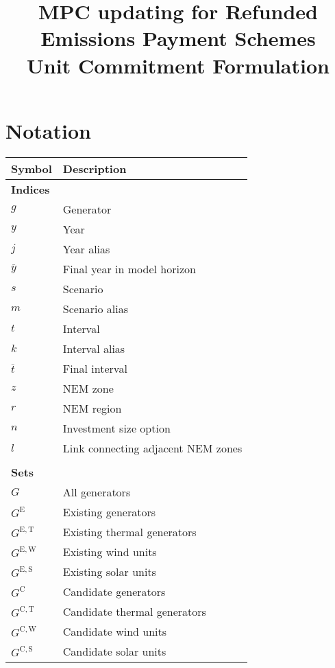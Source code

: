 \documentclass{article}
\title{MPC updating for Refunded Emissions Payment Schemes\\Unit Commitment Formulation}
\newcommand{\sGenerators}{G}
\newcommand{\sGeneratorsExisting}{G^{\mathrm{E}}}
\newcommand{\sGeneratorsExistingThermal}{G^{\mathrm{E,T}}}
\newcommand{\sGeneratorsExistingWind}{G^{\mathrm{E,W}}}
\newcommand{\sGeneratorsExistingSolar}{G^{\mathrm{E,S}}}
\newcommand{\sGeneratorsCandidate}{G^{\mathrm{C}}}
\newcommand{\sGeneratorsCandidateThermal}{G^{\mathrm{C,T}}}
\newcommand{\sGeneratorsCandidateWind}{G^{\mathrm{C,W}}}
\newcommand{\sGeneratorsCandidateSolar}{G^{\mathrm{C,S}}}
\newcommand{\iGenerator}{g}
\newcommand{\iYear}{y}
\newcommand{\iYearTerminal}{\overline{\iYear}}
\newcommand{\iYearAlias}{j}
\newcommand{\iScenario}{s}
\newcommand{\iScenarioAlias}{m}
\newcommand{\iInterval}{t}
\newcommand{\iIntervalAlias}{k}
\newcommand{\iIntervalTerminal}{\overline{\iInterval}}
\newcommand{\iZone}{z}
\newcommand{\iRegion}{r}
\newcommand{\iInvestmentSizeOption}{n}
\newcommand{\iLink}{l}
\begin{document}
	\maketitle
	

\section{Notation}
\renewcommand*{\arraystretch}{1.3}
\begin{longtable}{ p{}  p{}}
	\textbf{Symbol} & \textbf{Description}\\
	\hline\hline
	\multicolumn{2}{l}{\textbf{Indices}}\\
	$\iGenerator$ & Generator\\ 
	$\iYear$ & Year\\
	$\iYearAlias$ & Year alias\\
	$\iYearTerminal$ & Final year in model horizon\\
	$\iScenario$ & Scenario\\
	$\iScenarioAlias$ & Scenario alias\\
	$\iInterval$ & Interval\\
	$\iIntervalAlias$ & Interval alias\\
	$\iIntervalTerminal$ & Final interval\\
	$\iZone$ & NEM zone\\
	$\iRegion$ & NEM region\\
	$\iInvestmentSizeOption$ & Investment size option\\
	$\iLink$ & Link connecting adjacent NEM zones\\
	& \\
	\multicolumn{2}{l}{\textbf{Sets}}\\
	$\sGenerators$ & All generators\\
	$\sGeneratorsExisting$ & Existing generators\\
	$\sGeneratorsExistingThermal$ & Existing thermal generators\\
	$\sGeneratorsExistingWind$ & Existing wind units\\
	$\sGeneratorsExistingSolar$ & Existing solar units\\
	$\sGeneratorsCandidate$ & Candidate generators\\
	$\sGeneratorsCandidateThermal$ & Candidate thermal generators\\
	$\sGeneratorsCandidateWind$ & Candidate wind units\\
	$\sGeneratorsCandidateSolar$ & Candidate solar units\\

\end{longtable}
\end{document}
